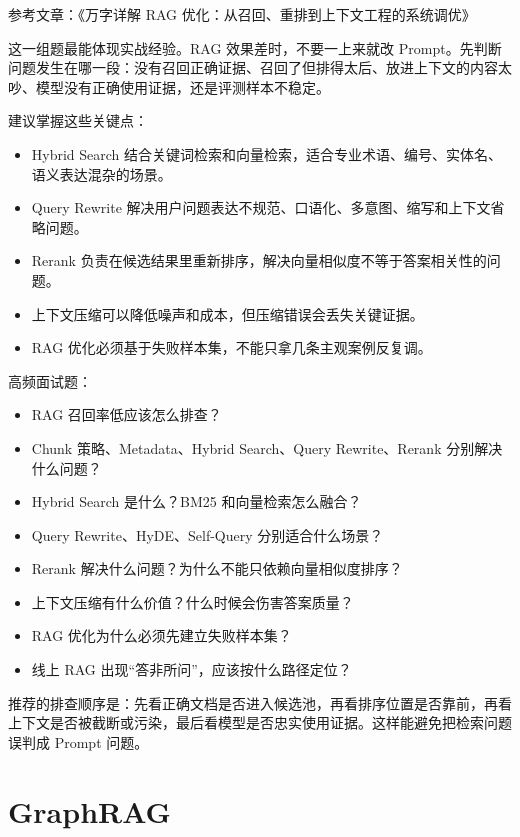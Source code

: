 \documentclass[9pt,a4paper,twocolumn]{ctexart}
\begin{document}
参考文章：《万字详解 RAG 优化：从召回、重排到上下文工程的系统调优》



这一组题最能体现实战经验。RAG 效果差时，不要一上来就改 Prompt。先判断问题发生在哪一段：没有召回正确证据、召回了但排得太后、放进上下文的内容太吵、模型没有正确使用证据，还是评测样本不稳定。



建议掌握这些关键点：


\begin{itemize}[itemsep=1pt, topsep=2pt]
  \item Hybrid Search 结合关键词检索和向量检索，适合专业术语、编号、实体名、语义表达混杂的场景。
  \item Query Rewrite 解决用户问题表达不规范、口语化、多意图、缩写和上下文省略问题。
  \item Rerank 负责在候选结果里重新排序，解决向量相似度不等于答案相关性的问题。
  \item 上下文压缩可以降低噪声和成本，但压缩错误会丢失关键证据。
  \item RAG 优化必须基于失败样本集，不能只拿几条主观案例反复调。
\end{itemize}


高频面试题：


\begin{itemize}[itemsep=1pt, topsep=2pt]
  \item RAG 召回率低应该怎么排查？
  \item Chunk 策略、Metadata、Hybrid Search、Query Rewrite、Rerank 分别解决什么问题？
  \item Hybrid Search 是什么？BM25 和向量检索怎么融合？
  \item Query Rewrite、HyDE、Self-Query 分别适合什么场景？
  \item Rerank 解决什么问题？为什么不能只依赖向量相似度排序？
  \item 上下文压缩有什么价值？什么时候会伤害答案质量？
  \item RAG 优化为什么必须先建立失败样本集？
  \item 线上 RAG 出现“答非所问”，应该按什么路径定位？
\end{itemize}


推荐的排查顺序是：先看正确文档是否进入候选池，再看排序位置是否靠前，再看上下文是否被截断或污染，最后看模型是否忠实使用证据。这样能避免把检索问题误判成 Prompt 问题。



\section*{GraphRAG}
\end{document}
